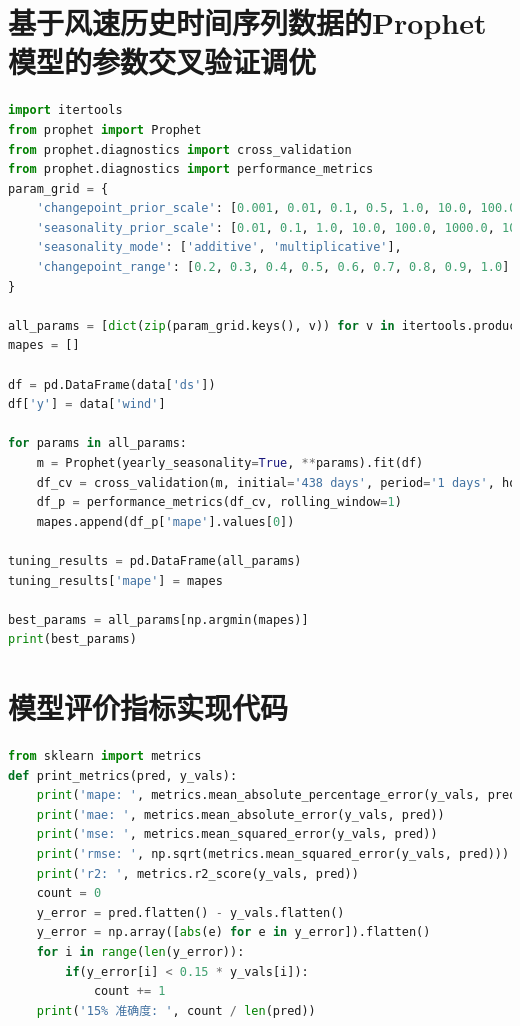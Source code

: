 \documentclass[AutoFakeBold]{LZUThesis}
\begin{document}
\section{基于风速历史时间序列数据的Prophet模型的参数交叉验证调优}

\begin{lstlisting}[language = python]
import itertools
from prophet import Prophet
from prophet.diagnostics import cross_validation
from prophet.diagnostics import performance_metrics
param_grid = {  
    'changepoint_prior_scale': [0.001, 0.01, 0.1, 0.5, 1.0, 10.0, 100.0, 1000.0, 10000.0],
    'seasonality_prior_scale': [0.01, 0.1, 1.0, 10.0, 100.0, 1000.0, 10000.0],
    'seasonality_mode': ['additive', 'multiplicative'],
    'changepoint_range': [0.2, 0.3, 0.4, 0.5, 0.6, 0.7, 0.8, 0.9, 1.0]
}

all_params = [dict(zip(param_grid.keys(), v)) for v in itertools.product(*param_grid.values())]
mapes = []

df = pd.DataFrame(data['ds'])
df['y'] = data['wind']

for params in all_params:
    m = Prophet(yearly_seasonality=True, **params).fit(df)
    df_cv = cross_validation(m, initial='438 days', period='1 days', horizon = '12H', parallel="processes")
    df_p = performance_metrics(df_cv, rolling_window=1)
    mapes.append(df_p['mape'].values[0])

tuning_results = pd.DataFrame(all_params)
tuning_results['mape'] = mapes

best_params = all_params[np.argmin(mapes)]
print(best_params)
\end{lstlisting}

\section{模型评价指标实现代码}

\begin{lstlisting}[language = python]
from sklearn import metrics
def print_metrics(pred, y_vals):
    print('mape: ', metrics.mean_absolute_percentage_error(y_vals, pred))
    print('mae: ', metrics.mean_absolute_error(y_vals, pred))
    print('mse: ', metrics.mean_squared_error(y_vals, pred))
    print('rmse: ', np.sqrt(metrics.mean_squared_error(y_vals, pred)))
    print('r2: ', metrics.r2_score(y_vals, pred))
    count = 0
    y_error = pred.flatten() - y_vals.flatten()
    y_error = np.array([abs(e) for e in y_error]).flatten()
    for i in range(len(y_error)):
        if(y_error[i] < 0.15 * y_vals[i]):
            count += 1
    print('15% 准确度: ', count / len(pred))
\end{lstlisting}
\end{document}

